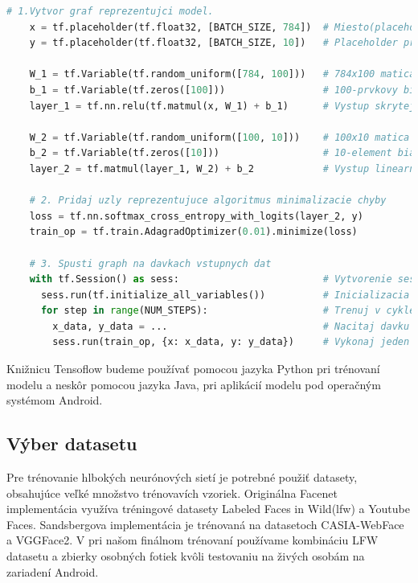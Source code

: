 \begin{lstlisting}[language=Python, label={fig:tfexample}, caption={Príklad klasifikácie pomocou Tensorflow}]
	# 1.Vytvor graf reprezentujci model.
	x = tf.placeholder(tf.float32, [BATCH_SIZE, 784])  # Miesto(placeholder) pre vstup.
	y = tf.placeholder(tf.float32, [BATCH_SIZE, 10])   # Placeholder pre triedy.
	
	W_1 = tf.Variable(tf.random_uniform([784, 100]))   # 784x100 matica vah.
	b_1 = tf.Variable(tf.zeros([100]))                 # 100-prvkovy bias vektor.
	layer_1 = tf.nn.relu(tf.matmul(x, W_1) + b_1)      # Vystup skrytej vrstvy.
	
	W_2 = tf.Variable(tf.random_uniform([100, 10]))    # 100x10 matica vah.
	b_2 = tf.Variable(tf.zeros([10]))                  # 10-element bias vector.
	layer_2 = tf.matmul(layer_1, W_2) + b_2            # Vystup linearnej vrstvy.
	
	# 2. Pridaj uzly reprezentujuce algoritmus minimalizacie chyby
	loss = tf.nn.softmax_cross_entropy_with_logits(layer_2, y)
	train_op = tf.train.AdagradOptimizer(0.01).minimize(loss)
	
	# 3. Spusti graph na davkach vstupnych dat
	with tf.Session() as sess:                         # Vytvorenie session.
	  sess.run(tf.initialize_all_variables())          # Inicializacia vah na nahodne hodnoty.
	  for step in range(NUM_STEPS):                    # Trenuj v cykle.
	    x_data, y_data = ...                           # Nacitaj davku vstupnych dat.
	    sess.run(train_op, {x: x_data, y: y_data})     # Vykonaj jeden treningovy cyklus.
\end{lstlisting}

\indent Knižnicu Tensoflow budeme používať pomocou jazyka Python pri trénovaní modelu a neskôr pomocou
jazyka Java, pri aplikácií modelu pod operačným systémom Android.

\subsection{Výber datasetu}
Pre trénovanie hlbokých neurónových sietí je potrebné použiť datasety, obsahujúce veľké množstvo trénovavích vzoriek.
Originálna Facenet implementácia \cite{schroff2015facenet} využíva tréningové datasety Labeled Faces in Wild(\acrshort{lfw}) a Youtube Faces.
Sandsbergova implementácia je trénovaná na datasetoch CASIA-WebFace a VGGFace2.
V pri našom finálnom trénovaní používame kombináciu LFW datasetu a zbierky osobných fotiek kvôli testovaniu na živých osobám na zariadení Android.

